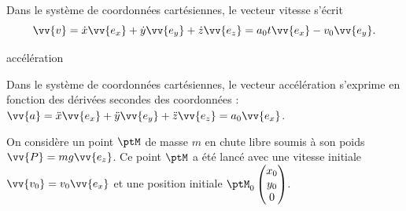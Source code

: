 
\begin{corrige}
Dans le système de coordonnées cartésiennes, le vecteur vitesse s'écrit 
\[
\vv{v}=\dot{x}\vv{e_x}+\dot{y}\vv{e_y}+\dot{z}\vv{e_z}=a_0 t \vv{e_x} - v_0 \vv{e_y}.
\]
\end{corrige}



\begin{enonce}
	 accélération
\end{enonce}


\begin{corrige}
 Dans le système de coordonnées cartésiennes, le vecteur accélération s'exprime en fonction des dérivées secondes des coordonnées : $\vv{a} =\ddot{x}\vv{e_x}+\ddot{y}\vv{e_y}+\ddot{z}\vv{e_z}=a_0 \vv{e_x}$.
\end{corrige}

\finEntrainement


\newpage



\hauteurLargeurCadreReponse		{2cm}{3cm}
\typeEntrainement				{} %
\initialisationEntrainement

On considère un point $\ptM$ de masse $m$ en chute libre soumis à son poids $\vv{P}=mg\vv{e_z}$. Ce point $\ptM$ a été lancé avec une vitesse initiale $\vv{v_0} = v_0 \vv{e_x}$ et une position initiale $\ptM_0 \begin{pmatrix}x_0 \\ y_0 \\0\end{pmatrix}$.

